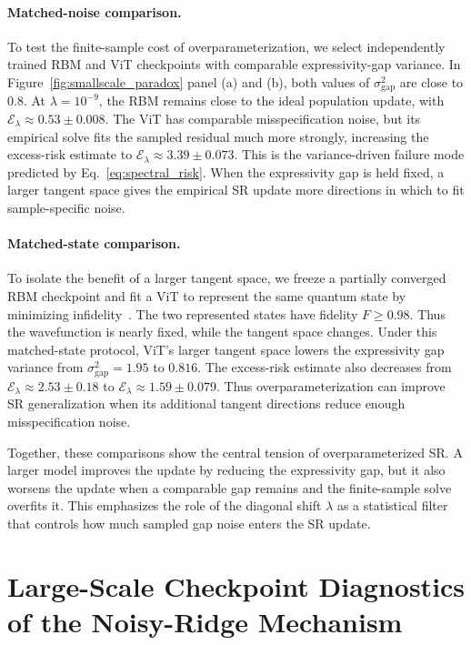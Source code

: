 \documentclass{article}
\begin{document}
\paragraph{Matched-noise comparison.}
To test the finite-sample cost of overparameterization, we select independently
trained RBM and ViT checkpoints with comparable expressivity-gap variance. In
Figure~\ref{fig:smallscale_paradox} panel (a) and (b), both values of
$\sigma_{\mathrm{gap}}^2$ are close to $0.8$. At
$\lambda=10^{-9}$, the RBM remains close to the ideal population update, with
$\mathcal E_\lambda\approx0.53\pm0.008$. The ViT has comparable
misspecification noise, but its empirical solve fits the sampled residual much
more strongly, increasing the excess-risk estimate to
$\mathcal E_\lambda\approx3.39\pm0.073$. This is the variance-driven failure mode
predicted by Eq.~\eqref{eq:spectral_risk}. When the expressivity gap is held fixed,
a larger tangent space gives the empirical SR update more directions in which to
fit sample-specific noise.

\paragraph{Matched-state comparison.}
To isolate the benefit of a larger tangent space, we freeze a partially
converged RBM checkpoint and fit a ViT to represent the same quantum state by
minimizing infidelity~\cite{sinibaldi2023unbiasing,gravina2410neural}. The two represented states have fidelity \(F\geq0.98\).
Thus the wavefunction is nearly fixed, while the tangent space changes. Under
this matched-state protocol, ViT's larger tangent space lowers the
expressivity gap variance from \(\sigma_{\mathrm{gap}}^2=1.95\) to \(0.816\).
The excess-risk estimate also decreases from
\(\mathcal E_\lambda\approx2.53\pm0.18\) to
\(\mathcal E_\lambda\approx1.59\pm0.079\). Thus overparameterization can improve
SR generalization when its additional tangent directions reduce enough
misspecification noise.

Together, these comparisons show the central tension of overparameterized SR.
A larger model improves the update by reducing the expressivity gap, but it also worsens the update when a comparable gap remains and the finite-sample
solve overfits it. This emphasizes the role of the diagonal shift $\lambda$ as a statistical filter that controls how much sampled
gap noise enters the SR update. 

\section{Large-Scale Checkpoint Diagnostics of the Noisy-Ridge Mechanism}
\label{sec:large_scale}
\end{document}
